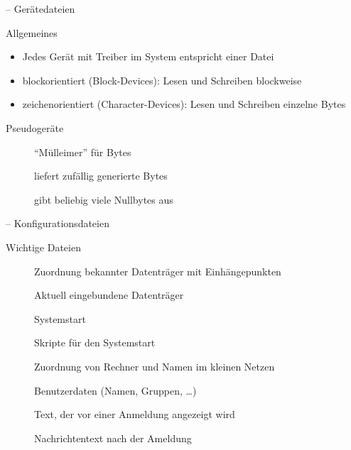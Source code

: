\documentclass[aspectratio=43]{beamer}
\begin{document}
\begin{frame}{ -- Gerätedateien}
  \begin{block}{Allgemeines}
    \begin{itemize}
     \item Jedes Gerät mit Treiber im System entspricht einer Datei
     \item blockorientiert (Block-Devices): Lesen und Schreiben blockweise
     \item zeichenorientiert (Character-Devices): Lesen und Schreiben einzelne Bytes
    \end{itemize}
  \end{block}
  \begin{block}{Pseudogeräte}
    \begin{description}
      \item[] ``Mülleimer'' für Bytes
      \item[] liefert zufällig generierte Bytes
      \item[] gibt beliebig viele Nullbytes aus
    \end{description}
  \end{block}
\end{frame}

\begin{frame}{ -- Konfigurationsdateien}
%     
  \begin{block}{Wichtige Dateien}
    \begin{description}
      \item[] Zuordnung bekannter Datenträger mit Einhängepunkten
      \item[] Aktuell eingebundene Datenträger
      \item[] Systemstart
      \item[] Skripte für den Systemstart
      \item[] Zuordnung von Rechner und Namen im kleinen Netzen
      \item[] Benutzerdaten (Namen, Gruppen, \dots)
      \item[] Text, der vor einer Anmeldung angezeigt wird
      \item[] Nachrichtentext nach der Ameldung
    \end{description}
  \end{block}
\end{frame}
\end{document}
